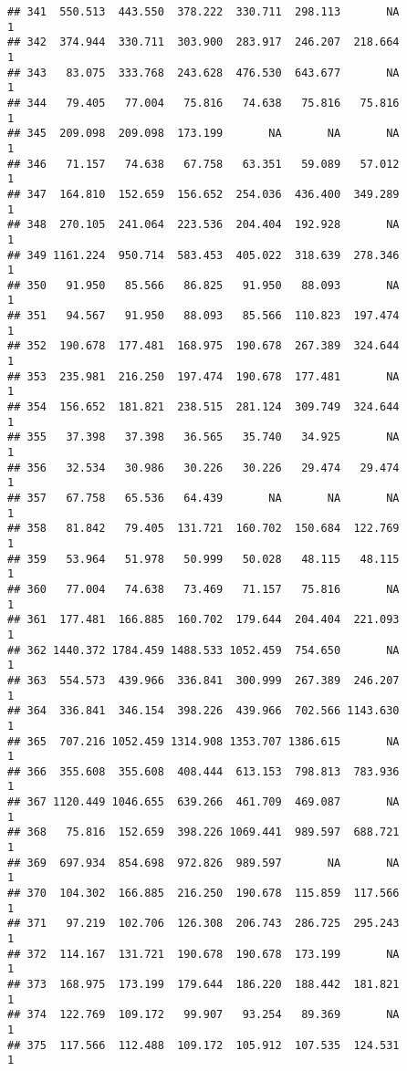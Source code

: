 \documentclass[
]{article}
\begin{document}
\begin{verbatim}
## 341  550.513  443.550  378.222  330.711  298.113       NA             1
## 342  374.944  330.711  303.900  283.917  246.207  218.664             1
## 343   83.075  333.768  243.628  476.530  643.677       NA             1
## 344   79.405   77.004   75.816   74.638   75.816   75.816             1
## 345  209.098  209.098  173.199       NA       NA       NA             1
## 346   71.157   74.638   67.758   63.351   59.089   57.012             1
## 347  164.810  152.659  156.652  254.036  436.400  349.289             1
## 348  270.105  241.064  223.536  204.404  192.928       NA             1
## 349 1161.224  950.714  583.453  405.022  318.639  278.346             1
## 350   91.950   85.566   86.825   91.950   88.093       NA             1
## 351   94.567   91.950   88.093   85.566  110.823  197.474             1
## 352  190.678  177.481  168.975  190.678  267.389  324.644             1
## 353  235.981  216.250  197.474  190.678  177.481       NA             1
## 354  156.652  181.821  238.515  281.124  309.749  324.644             1
## 355   37.398   37.398   36.565   35.740   34.925       NA             1
## 356   32.534   30.986   30.226   30.226   29.474   29.474             1
## 357   67.758   65.536   64.439       NA       NA       NA             1
## 358   81.842   79.405  131.721  160.702  150.684  122.769             1
## 359   53.964   51.978   50.999   50.028   48.115   48.115             1
## 360   77.004   74.638   73.469   71.157   75.816       NA             1
## 361  177.481  166.885  160.702  179.644  204.404  221.093             1
## 362 1440.372 1784.459 1488.533 1052.459  754.650       NA             1
## 363  554.573  439.966  336.841  300.999  267.389  246.207             1
## 364  336.841  346.154  398.226  439.966  702.566 1143.630             1
## 365  707.216 1052.459 1314.908 1353.707 1386.615       NA             1
## 366  355.608  355.608  408.444  613.153  798.813  783.936             1
## 367 1120.449 1046.655  639.266  461.709  469.087       NA             1
## 368   75.816  152.659  398.226 1069.441  989.597  688.721             1
## 369  697.934  854.698  972.826  989.597       NA       NA             1
## 370  104.302  166.885  216.250  190.678  115.859  117.566             1
## 371   97.219  102.706  126.308  206.743  286.725  295.243             1
## 372  114.167  131.721  190.678  190.678  173.199       NA             1
## 373  168.975  173.199  179.644  186.220  188.442  181.821             1
## 374  122.769  109.172   99.907   93.254   89.369       NA             1
## 375  117.566  112.488  109.172  105.912  107.535  124.531             1

\end{verbatim}
\end{document}
